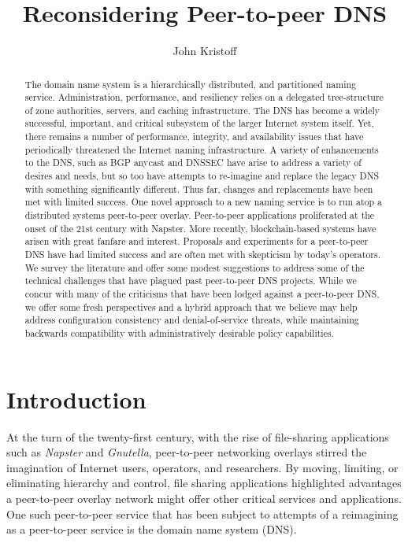 \documentclass[sigconf]{acmart}
\begin{document}
\title{Reconsidering Peer-to-peer DNS}
\author{John Kristoff}

\begin{abstract}

The domain name system is a hierarchically distributed, and partitioned
naming service.  Administration, performance, and resiliency relies on a
delegated tree-structure of zone authorities, servers, and caching
infrastructure.  The DNS has become a widely successful, important, and
critical subsystem of the larger Internet system itself.  Yet, there
remains a number of performance, integrity, and availability issues that
have periodically threatened the Internet naming infrastructure.  A
variety of enhancements to the DNS, such as BGP anycast and DNSSEC have
arise to address a variety of desires and needs, but so too have
attempts to re-imagine and replace the legacy DNS with something
significantly different.  Thus far, changes and replacements have been
met with limited success.  One novel approach to a new naming service is
to run atop a distributed systems peer-to-peer overlay.  Peer-to-peer
applications proliferated at the onset of the 21st century with Napster.
More recently, blockchain-based systems have arisen with great fanfare
and interest.  Proposals and experiments for a peer-to-peer DNS have had
limited success and are often met with skepticism by today's operators.
We survey the literature and offer some modest suggestions to address
some of the technical challenges that have plagued past peer-to-peer DNS
projects.  While we concur with many of the criticisms that have been
lodged against a peer-to-peer DNS, we offer some fresh perspectives and
a hybrid approach that we believe may help address configuration
consistency and denial-of-service threats, while maintaining backwards
compatibility with administratively desirable policy capabilities.

\end{abstract}

\maketitle

\section{Introduction}

At the turn of the twenty-first century, with the rise of file-sharing
applications such as \emph{Napster} and \emph{Gnutella}, peer-to-peer
networking overlays stirred the imagination of Internet users,
operators, and researchers.  By moving, limiting, or eliminating
hierarchy and control, file sharing applications highlighted advantages
a peer-to-peer overlay network might offer other critical services and
applications.  One such peer-to-peer service that has been subject to
attempts of a reimagining as a peer-to-peer service is the domain name
system (DNS).
\end{document}
